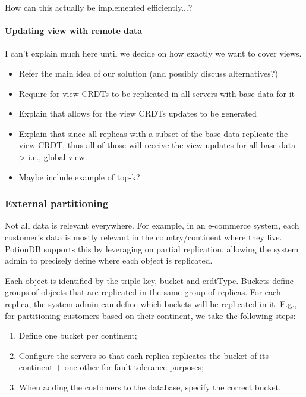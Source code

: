 \documentclass{vldb}
\newcommand{\grumbler}[2]{{\color{red}{\bf #1:} #2}}
\newcommand{\andre}[1]{\grumbler{andre}{#1}}
\begin{document}
\andre{How can this actually be implemented efficiently...?}

\paragraph{Updating view with remote data}

\andre{I can't explain much here until we decide on how exactly we want to cover views.}

\begin{itemize}
	\item Refer the main idea of our solution (and possibly discuss alternatives?)
	\item Require for view CRDTs to be replicated in all servers with base data for it
	\item Explain that allows for the view CRDTs updates to be generated
	\item Explain that since all replicas with a subset of the base data replicate the view CRDT, thus all of those will receive the view updates for all base data -> i.e., global view.
	\item Maybe include example of top-k?
\end{itemize}

\subsubsection{External partitioning}

Not all data is relevant everywhere. 
For example, in an e-commerce system, each customer's data is mostly relevant in the country/continent where they live.
PotionDB supports this by leveraging on partial replication, allowing the system admin to precisely define where each object is replicated.

Each object is identified by the triple key, bucket and crdtType.
Buckets define groups of objects that are replicated in the same group of replicas.
For each replica, the system admin can define which buckets will be replicated in it.
E.g., for partitioning customers based on their continent, we take the following steps:

\begin{enumerate}
	\item Define one bucket per continent;
	\item Configure the servers so that each replica replicates the bucket of its continent + one other for fault tolerance purposes;
	\item When adding the customers to the database, specify the correct bucket.
\end{enumerate}
\end{document}
